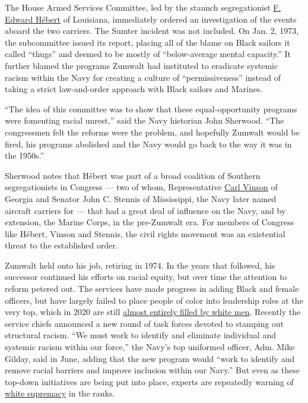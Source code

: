 The House Armed Services Committee, led by the staunch segregationist
\href{https://www.nytimes3xbfgragh.onion/1979/12/30/archives/f-edward-hebert-exlawmaker-dies-conservative-louisiana-democrat.html}{F.
Edward Hébert} of Louisiana, immediately ordered an investigation of the
events aboard the two carriers. The Sumter incident was not included. On
Jan. 2, 1973, the subcommittee issued its report, placing all of the
blame on Black sailors it called ``thugs'' and deemed to be mostly of
``below-average mental capacity.'' It further blamed the programs
Zumwalt had instituted to eradicate systemic racism within the Navy for
creating a culture of ``permissiveness'' instead of taking a strict
law-and-order approach with Black sailors and Marines.

``The idea of this committee was to show that these equal-opportunity
programs were fomenting racial unrest,'' said the Navy historian John
Sherwood. ``The congressmen felt the reforms were the problem, and
hopefully Zumwalt would be fired, his programs abolished and the Navy
would go back to the way it was in the 1950s.''

Sherwood notes that Hébert was part of a broad coalition of Southern
segregationists in Congress --- two of whom, Representative
\href{https://www.nytimes3xbfgragh.onion/1981/06/02/obituaries/carl-vinson-97-ex-congressman-who-was-with-house-50-years-dies.html}{Carl
Vinson} of Georgia and Senator John C. Stennis of Mississippi, the Navy
later named aircraft carriers for --- that had a great deal of influence
on the Navy, and by extension, the Marine Corps, in the pre-Zumwalt era.
For members of Congress like Hébert, Vinson and Stennis, the civil
rights movement was an existential threat to the established order.

Zumwalt held onto his job, retiring in 1974. In the years that followed,
his successor continued his efforts on racial equity, but over time the
attention to reform petered out. The services have made progress in
adding Black and female officers, but have largely failed to place
people of color into leadership roles at the very top, which in 2020 are
still
\href{https://www.nytimes3xbfgragh.onion/2020/05/25/us/politics/military-minorities-leadership.html}{almost
entirely filled by white men}. Recently the service chiefs announced a
new round of task forces devoted to stamping out structural racism. ``We
must work to identify and eliminate individual and systemic racism
within our force,'' the Navy's top uniformed officer, Adm. Mike Gilday,
said in June, adding that the new program would ``work to identify and
remove racial barriers and improve inclusion within our Navy.'' But even
as these top-down initiatives are being put into place, experts are
repeatedly warning of
\href{https://www.nytimes3xbfgragh.onion/2019/02/27/us/military-white-nationalists-extremists.html}{white
supremacy} in the ranks.


